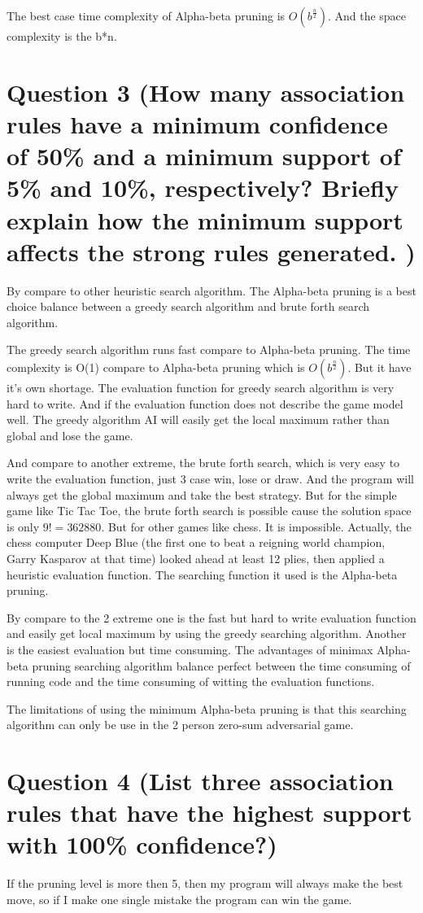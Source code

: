 \documentclass[titlepage]{article}
\begin{document}
The best case time complexity of Alpha-beta pruning is \(O(b^{\frac{n}{2}})\).
And the space complexity is the b*n.

\section{Question 3 (How many association rules have a minimum confidence of 50\% and a minimum support of 5\% and 10\%, respectively? Briefly explain how the minimum support affects the strong rules generated. )}
\label{sec:orga8cc08e}

By compare to other heuristic search algorithm. The Alpha-beta pruning is a
best choice balance between a greedy search algorithm and brute forth search
algorithm.

The greedy search algorithm runs fast compare to Alpha-beta pruning. The time
complexity is O(1) compare to Alpha-beta pruning which is \(O(b^{\frac{n}{2}})\). But it
have it's own shortage. The evaluation function for greedy search algorithm is
very hard to write. And if the evaluation function does not describe the game
model well. The greedy algorithm AI will easily get the local maximum rather
than global and lose the game.

And compare to another extreme, the brute forth search, which is very easy to
write the evaluation function, just 3 case win, lose or draw. And the program
will always get the global maximum and take the best strategy. But for the
simple game like Tic Tac Toe, the brute forth search is possible cause the
solution space is only \(9! = 362880\). But for other games like chess. It is
impossible. Actually, the chess computer Deep Blue (the first one to beat a
reigning world champion, Garry Kasparov at that time) looked ahead at least 12
plies, then applied a heuristic evaluation function. The searching function it
used is the Alpha-beta pruning.

By compare to the 2 extreme one is the fast but hard to write evaluation
function and easily get local maximum by using the greedy searching algorithm.
Another is the easiest evaluation but time consuming. The advantages of
minimax Alpha-beta pruning searching algorithm balance perfect between the
time consuming of running code and the time consuming of witting the
evaluation functions.

The limitations of using the minimum Alpha-beta pruning is that this searching
algorithm can only be use in the 2 person zero-sum adversarial game.

\section{Question 4 (List three association rules that have the highest support with 100\% confidence?)}
\label{sec:orgfb3770d}
If the pruning level is more then 5, then my program will always make the best move, so if I make one single mistake the program can win the game.
\end{document}
